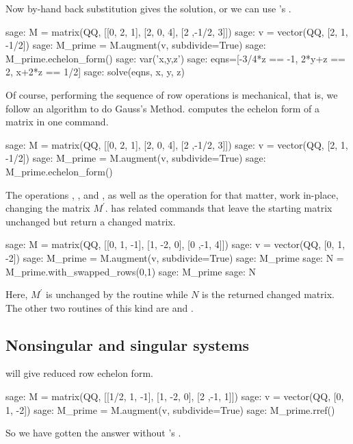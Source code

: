 Now by-hand back substitution gives the solution, or we can 
use \Sage's .
\begin{sagecommandline}
sage: M = matrix(QQ, [[0, 2, 1], [2, 0, 4], [2 ,-1/2, 3]])
sage: v = vector(QQ, [2, 1, -1/2])                        
sage: M_prime = M.augment(v, subdivide=True)
sage: M_prime.echelon_form()              
sage: var('x,y,z')
sage: eqns=[-3/4*z == -1, 2*y+z == 2, x+2*z == 1/2]
sage: solve(eqns, x, y, z)
\end{sagecommandline}

Of course, performing the sequence of row operations
is mechanical, that is, we follow an algorithm to do Gauss's Method. 
\Sage{} computes the echelon form of a 
matrix in one command.
\begin{sagecommandline}
sage: M = matrix(QQ, [[0, 2, 1], [2, 0, 4], [2 ,-1/2, 3]])
sage: v = vector(QQ, [2, 1, -1/2])                        
sage: M_prime = M.augment(v, subdivide=True)              
sage: M_prime.echelon_form()                                            
\end{sagecommandline}

The operations ,
, and ,
as well as the operation  for that matter,
work in-place, changing the matrix $M^\prime$.
\Sage{} has related commands that leave the starting matrix unchanged
but return a changed matrix.
\begin{sagecommandline}
sage: M = matrix(QQ, [[0, 1, -1], [1, -2, 0], [0 ,-1, 4]])
sage: v = vector(QQ, [0, 1, -2])
sage: M_prime = M.augment(v, subdivide=True) 
sage: M_prime
sage: N = M_prime.with_swapped_rows(0,1)
sage: M_prime
sage: N      
\end{sagecommandline}
Here, $M^\prime$ is unchanged by the routine while $N$ is the returned 
changed matrix.
The other two routines of this kind are  
and .




\subsection{Nonsingular and singular systems}
\Sage{} will give reduced row echelon form.
\begin{sagecommandline}
sage: M = matrix(QQ, [[1/2, 1, -1], [1, -2, 0], [2 ,-1, 1]])
sage: v = vector(QQ, [0, 1, -2])
sage: M_prime = M.augment(v, subdivide=True) 
sage: M_prime.rref()
\end{sagecommandline}
So we have gotten the answer without \Sage's .

